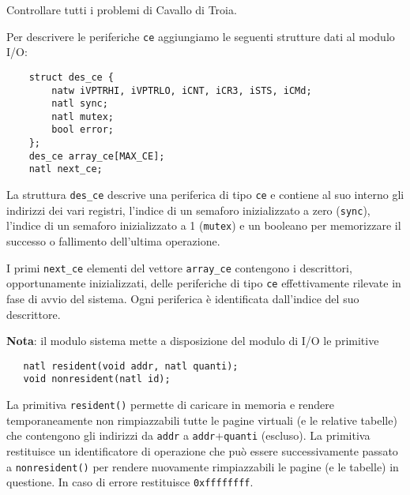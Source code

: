 Controllare tutti i problemi di Cavallo di Troia.

Per descrivere le periferiche \verb|ce| aggiungiamo le seguenti strutture dati al modulo I/O:
\begin{verbatim}
    struct des_ce {
        natw iVPTRHI, iVPTRLO, iCNT, iCR3, iSTS, iCMd;
        natl sync;
        natl mutex;
        bool error;
    }; 
    des_ce array_ce[MAX_CE];
    natl next_ce;
\end{verbatim}
La struttura \verb|des_ce| descrive una periferica di tipo \verb|ce| e contiene al suo interno gli indirizzi
dei vari registri, l'indice di un semaforo inizializzato a zero (\verb|sync|), l'indice di un semaforo
inizializzato a 1 (\verb|mutex|) e un booleano per memorizzare il successo o fallimento dell'ultima operazione.

I primi \verb|next_ce| elementi del vettore \verb|array_ce| contengono i descrittori, opportunamente inizializzati,
delle periferiche di tipo \verb|ce| effettivamente rilevate in fase di avvio del sistema. Ogni periferica \`e identificata
dall'indice del suo descrittore.

{\bf Nota}: il modulo sistema mette a disposizione del modulo di I/O le primitive 
\begin{verbatim}
   natl resident(void addr, natl quanti);
   void nonresident(natl id);
\end{verbatim}
La primitiva \verb|resident()| permette di caricare in memoria e rendere temporaneamente non rimpiazzabili tutte le pagine
virtuali (e le relative tabelle) che contengono gli indirizzi da \verb|addr| a \verb|addr|+\verb|quanti| (escluso).
La primitiva restituisce un identificatore di operazione che pu\`o essere successivamente passato a \verb|nonresident()|
per rendere nuovamente rimpiazzabili le pagine (e le tabelle) in questione. In caso di errore restituisce \verb|0xffffffff|.
